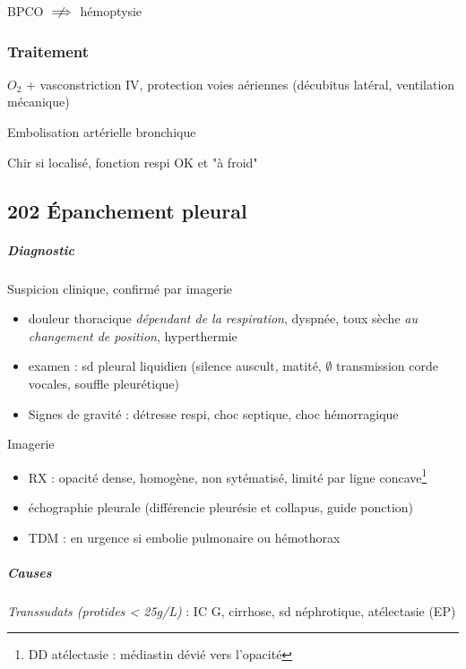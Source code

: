\documentclass[11pt]{article}
\begin{document}
\danger BPCO \(\centernot\implies\) hémoptysie

\subsubsection{Traitement}
\label{sec:orgc113f52}
\(O_2\) + vasconstriction IV, protection voies aériennes (décubitus latéral,
ventilation mécanique)

Embolisation artérielle bronchique

Chir si localisé, fonction respi OK et "à froid"

\subsection{202 Épanchement pleural}
\label{sec:orgf2250f5}
\subparagraph{Diagnostic}
\label{sec:orgbcc5852}
Suspicion clinique, confirmé par imagerie
\begin{itemize}
\item douleur thoracique \emph{dépendant de la respiration}, dyspnée, toux sèche \emph{au
changement de position}, hyperthermie
\item examen : sd pleural liquidien (silence auscult, matité, \(\emptyset\) transmission
corde vocales, souffle pleurétique)
\item \danger Signes de gravité : détresse respi, choc septique, choc hémorragique
\end{itemize}
Imagerie
\begin{itemize}
\item RX : opacité dense, homogène, non sytématisé, limité par ligne concave\footnote{DD atélectasie : médiastin dévié vers l'opacité}
\item échographie pleurale (différencie pleurésie et collapus, guide ponction)
\item TDM : en urgence si embolie pulmonaire ou hémothorax
\end{itemize}

\subparagraph{Causes}
\label{sec:orgd050d8e}

\emph{Transsudats (protides < 25g/L)} : IC G, cirrhose, sd néphrotique, atélectasie (EP)
\end{document}
